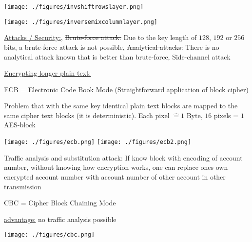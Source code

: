 \documentclass[landscape, a4paper]{article}
\begin{document}
\begin{minipage}[t]{0.2\linewidth}
\begin{betterlist}
		\begin{minipage}[b]{0.5\linewidth}
			\texttt{[image: ./figures/invshiftrowslayer.png]}
		\end{minipage}
		\begin{minipage}[b]{0.5\linewidth}
			\texttt{[image: ./figures/inversemixcolumnlayer.png]}
		\end{minipage}
		\item \underline{Attacks / Security:}, \sout{Brute-force attack:} Due to the key length of $128$, $192$ or $256$ bits, a brute-force attack is not possible, \sout{Analytical attacks:} There is no analytical attack known that is better than brute-force, Side-channel attack
	\end{betterlist}
\end{minipage}
\begin{minipage}[t]{0.2\linewidth}
	\begin{betterlist}
		\item \underline{Encrypting longer plain text:}
		\begin{betterlist}
			\item \alert{ECB} = Electronic Code Book Mode (Straightforward application of block cipher)
			\begin{betterlist}
				\item Problem that with the same key identical plain text blocks are mapped to the same cipher text blocks (it is deterministic). Each pixel $\hat= 1$ Byte, $16$ pixels = $1$ AES-block
			\end{betterlist}
			\texttt{[image: ./figures/ecb.png]}
			\texttt{[image: ./figures/ecb2.png]}
			\begin{betterlist}
				\item \alert{Traffic analysis and substitution attack:} If know block with encoding of account number, without knowing how encryption works, one can replace ones own encrypted account number with account number of other account in other transmission
			\end{betterlist}
			\item \alert{CBC} = Cipher Block Chaining Mode
			\begin{betterlist}
				\item \underline{advantage:} no \alert{traffic analysis} possible
			\end{betterlist}

			\texttt{[image: ./figures/cbc.png]}


\end{betterlist}
\end{betterlist}
\end{minipage}
\end{document}
